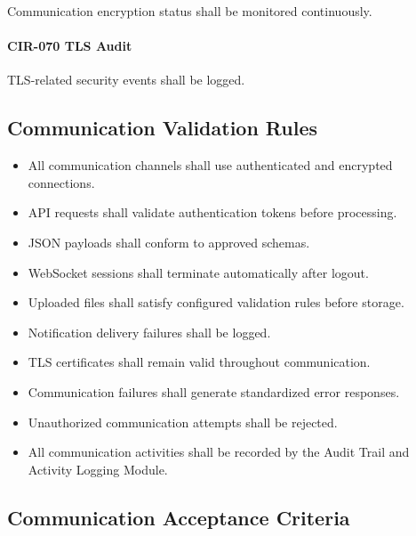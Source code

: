 Communication encryption status shall be monitored continuously.

\paragraph{CIR-070 TLS Audit}

TLS-related security events shall be logged.


\subsection*{Communication Validation Rules}

\begin{itemize}

\item All communication channels shall use authenticated and encrypted
connections.

\item API requests shall validate authentication tokens before
processing.

\item JSON payloads shall conform to approved schemas.

\item WebSocket sessions shall terminate automatically after logout.

\item Uploaded files shall satisfy configured validation rules before
storage.

\item Notification delivery failures shall be logged.

\item TLS certificates shall remain valid throughout communication.

\item Communication failures shall generate standardized error
responses.

\item Unauthorized communication attempts shall be rejected.

\item All communication activities shall be recorded by the Audit Trail
and Activity Logging Module.

\end{itemize}


\subsection*{Communication Acceptance Criteria}

